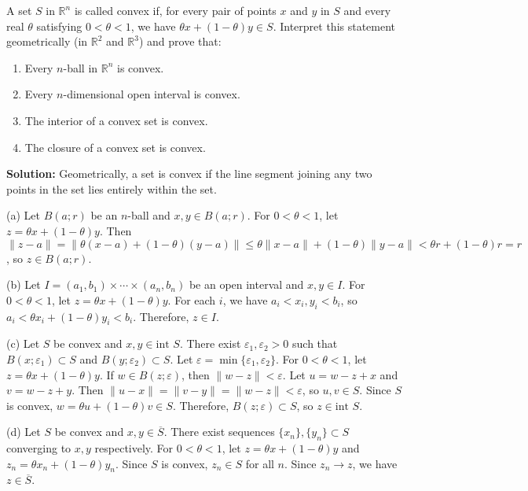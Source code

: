 \begin{problembox}
A set \( S \) in \( \mathbb{R}^n \) is called convex if, for every pair of points \( x \) and \( y \) in \( S \) and every real \( \theta \) satisfying \( 0 < \theta < 1 \), we have \( \theta x + (1 - \theta)y \in S \). Interpret this statement geometrically (in \( \mathbb{R}^2 \) and \( \mathbb{R}^3 \)) and prove that:
\begin{enumerate}[label=\alph*)]
\item Every \( n \)-ball in \( \mathbb{R}^n \) is convex.
\item Every \( n \)-dimensional open interval is convex.
\item The interior of a convex set is convex.
\item The closure of a convex set is convex.
\end{enumerate}
\end{problembox}

\textbf{Solution:} Geometrically, a set is convex if the line segment joining any two points in the set lies entirely within the set.

(a) Let $B(a;r)$ be an $n$-ball and $x, y \in B(a;r)$. For $0 < \theta < 1$, let $z = \theta x + (1-\theta)y$. Then $\|z-a\| = \|\theta(x-a) + (1-\theta)(y-a)\| \leq \theta\|x-a\| + (1-\theta)\|y-a\| < \theta r + (1-\theta)r = r$, so $z \in B(a;r)$.

(b) Let $I = (a_1,b_1) \times \cdots \times (a_n,b_n)$ be an open interval and $x, y \in I$. For $0 < \theta < 1$, let $z = \theta x + (1-\theta)y$. For each $i$, we have $a_i < x_i, y_i < b_i$, so $a_i < \theta x_i + (1-\theta)y_i < b_i$. Therefore, $z \in I$.

(c) Let $S$ be convex and $x, y \in \text{int } S$. There exist $\varepsilon_1, \varepsilon_2 > 0$ such that $B(x;\varepsilon_1) \subset S$ and $B(y;\varepsilon_2) \subset S$. Let $\varepsilon = \min\{\varepsilon_1, \varepsilon_2\}$. For $0 < \theta < 1$, let $z = \theta x + (1-\theta)y$. If $w \in B(z;\varepsilon)$, then $\|w-z\| < \varepsilon$. Let $u = w - z + x$ and $v = w - z + y$. Then $\|u-x\| = \|v-y\| = \|w-z\| < \varepsilon$, so $u, v \in S$. Since $S$ is convex, $w = \theta u + (1-\theta)v \in S$. Therefore, $B(z;\varepsilon) \subset S$, so $z \in \text{int } S$.

(d) Let $S$ be convex and $x, y \in \overline{S}$. There exist sequences $\{x_n\}, \{y_n\} \subset S$ converging to $x, y$ respectively. For $0 < \theta < 1$, let $z = \theta x + (1-\theta)y$ and $z_n = \theta x_n + (1-\theta)y_n$. Since $S$ is convex, $z_n \in S$ for all $n$. Since $z_n \to z$, we have $z \in \overline{S}$.

